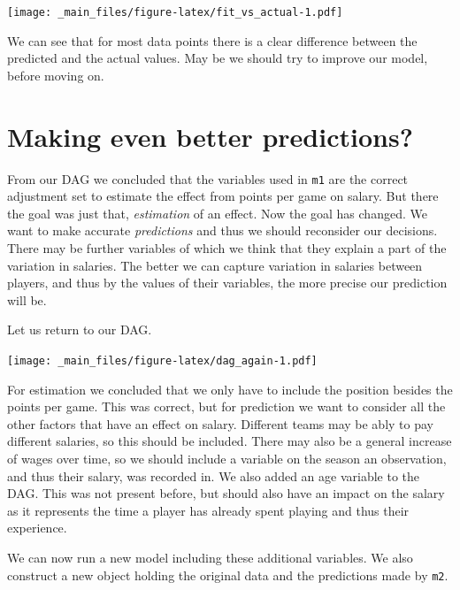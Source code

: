 \documentclass[
]{book}
\begin{document}
\texttt{[image: \_main\_files/figure-latex/fit\_vs\_actual-1.pdf]}

We can see that for most data points there is a clear difference between the
predicted and the actual values. May be we should try to improve our model,
before moving on.

\hypertarget{making-even-better-predictions}{%
\section{Making even better predictions?}\label{making-even-better-predictions}}

From our DAG we concluded that the variables used in \texttt{m1} are the correct
adjustment set to estimate the effect from points per game on salary. But there
the goal was just that, \emph{estimation} of an effect. Now the goal has changed. We
want to make accurate \emph{predictions} and thus we should reconsider our decisions.
There may be further variables of which we think that they explain a part of the
variation in salaries. The better we can capture variation in salaries between
players, and thus by the values of their variables, the more precise our
prediction will be.

Let us return to our DAG.

\texttt{[image: \_main\_files/figure-latex/dag\_again-1.pdf]}

For estimation we concluded that we only have to include the position besides
the points per game. This was correct, but for prediction we want to consider
all the other factors that have an effect on salary. Different teams may be ably
to pay different salaries, so this should be included. There may also be a
general increase of wages over time, so we should include a variable on the
season an observation, and thus their salary, was recorded in.
We also added an age variable to the DAG. This was not present before, but
should also have an impact on the salary as it represents the time a player has
already spent playing and thus their experience.

We can now run a new model including these additional variables. We also
construct a new object holding the original data and the predictions made by
\texttt{m2}.
\end{document}
